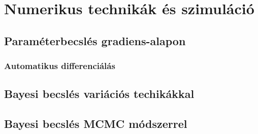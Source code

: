 \chapter{Numerikus technikák és szimuláció}
\label{ch:numsim}

\section{Paraméterbecslés gradiens-alapon}

\subsection{Automatikus differenciálás}

\section{Bayesi becslés variációs techikákkal}

\section{Bayesi becslés MCMC módszerrel}
